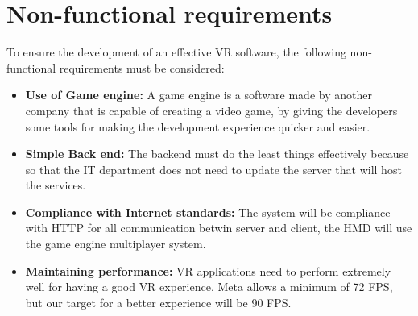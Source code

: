 \section{Non-functional requirements}
\noindent
To ensure the development of an effective \ac{VR} software, the following non-functional requirements must be considered:

\begin{itemize}
  \item \textbf{Use of Game engine:} A game engine is a software made by another company that is capable of creating a video game, by giving the developers some tools for making the development experience quicker and easier.
  \item \textbf{Simple Back end:} The backend must do the least things effectively because so that the IT department does not need to update the server that will host the services.
  \item \textbf{Compliance with Internet standards:} The system will be compliance with \ac{HTTP} for all communication betwin server and client, the \ac{HMD} will use the game engine multiplayer system.
  \item \textbf{Maintaining performance:} \ac{VR} applications need to perform extremely well for having a good \ac{VR} experience, Meta allows a minimum of 72 \ac{FPS}, but our target for a better experience will be 90 \ac{FPS}.
\end{itemize}

